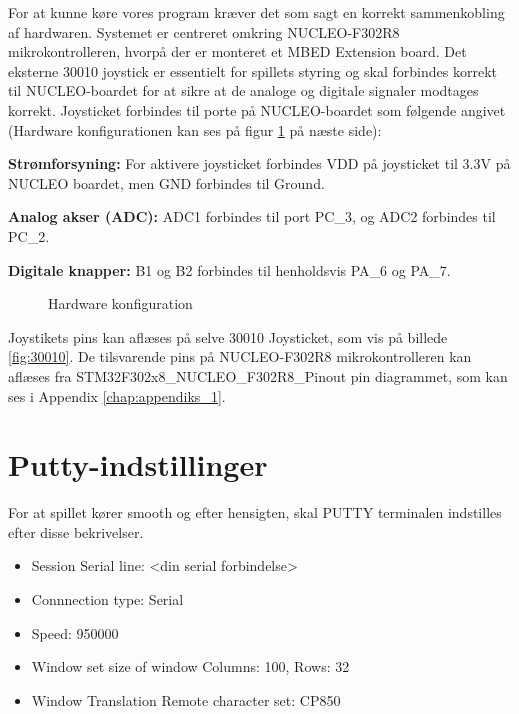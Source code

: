 For at kunne køre vores program kræver det som sagt en korrekt sammenkobling af hardwaren. Systemet er centreret omkring NUCLEO-F302R8 mikrokontrolleren, hvorpå der er monteret et MBED Extension board. Det eksterne 30010 joystick er essentielt for spillets styring og skal forbindes korrekt til NUCLEO-boardet for at sikre at de analoge og digitale signaler modtages korrekt. Joysticket forbindes til porte på NUCLEO-boardet som følgende angivet (Hardware konfigurationen kan ses på figur \ref{fig:hardware_konfiguration} på næste side): 

\vspace{2em}
\textbf{Strømforsyning:} For aktivere joysticket forbindes VDD på joysticket til 3.3V på NUCLEO boardet, men GND forbindes til Ground.

\vspace{-0.5em}
\textbf{Analog akser (ADC):} ADC1 forbindes til port PC\_3, og ADC2 forbindes til PC\_2. 

\vspace{-0.5em}
\textbf{Digitale knapper:} B1 og B2 forbindes til henholdsvis PA\_6 og PA\_7.

\begin{figure}[H]
    \centering
    
    \caption{Hardware konfiguration}
\label{fig:hardware_konfiguration}
\end{figure}
\vspace{-1em}

Joystikets pins kan aflæses på selve 30010 Joysticket, som vis på billede \ref{fig:30010}. De tilsvarende pins på NUCLEO-F302R8 mikrokontrolleren kan aflæses fra STM32F302x8\_NUCLEO\_F302R8\_Pinout pin diagrammet, som kan ses i Appendix \ref{chap:appendiks_1}.

\section{Putty-indstillinger}
\vspace{0.5em}

For at spillet kører smooth og efter hensigten, skal PUTTY terminalen indstilles efter disse bekrivelser.
\begin{itemize}
    \setlength{\itemsep}{4pt}
    \setlength{\parskip}{0pt}
    \setlength{\parsep}{0pt}
    \item Session \rightarrow Serial line: <din serial forbindelse> 
    \item Connnection type: Serial
    \item Speed: 950000
    \item Window \rightarrow set size of window \rightarrow Columns: 100, Rows: 32
    \item Window \rightarrow Translation \rightarrow Remote character set: CP850 
\end{itemize}

